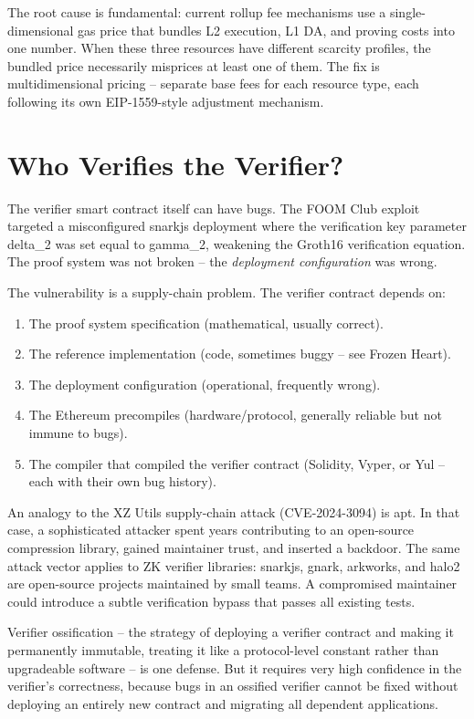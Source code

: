 \documentclass[
  11pt,
  openany]{report}
\providecommand{\tightlist}{%
  \setlength{\itemsep}{0pt}\setlength{\parskip}{0pt}}
\begin{document}
The root cause is fundamental: current rollup fee mechanisms use a
single-dimensional gas price that bundles L2 execution, L1 DA, and proving costs
into one number. When these three resources have different scarcity profiles,
the bundled price necessarily misprices at least one of them. The fix is
multidimensional pricing -- separate base fees for each resource type, each
following its own EIP-1559-style adjustment mechanism.

\section{Who Verifies the Verifier?}\label{who-verifies-the-verifier}

The verifier smart contract itself can have bugs. The FOOM Club exploit targeted
a misconfigured snarkjs deployment where the verification key parameter delta\_2
was set equal to gamma\_2, weakening the Groth16 verification equation. The
proof system was not broken -- the \emph{deployment configuration} was wrong.

The vulnerability is a supply-chain problem. The verifier contract depends on:

\begin{enumerate}
\def\labelenumi{\arabic{enumi}.}
\tightlist
\item
  The proof system specification (mathematical, usually correct).
\item
  The reference implementation (code, sometimes buggy -- see Frozen Heart).
\item
  The deployment configuration (operational, frequently wrong).
\item
  The Ethereum precompiles (hardware/protocol, generally reliable but not immune
  to bugs).
\item
  The compiler that compiled the verifier contract (Solidity, Vyper, or Yul --
  each with their own bug history).
\end{enumerate}

An analogy to the XZ Utils supply-chain attack (CVE-2024-3094) is apt. In that
case, a sophisticated attacker spent years contributing to an open-source
compression library, gained maintainer trust, and inserted a backdoor. The same
attack vector applies to ZK verifier libraries: snarkjs, gnark, arkworks, and
halo2 are open-source projects maintained by small teams. A compromised
maintainer could introduce a subtle verification bypass that passes all existing
tests.

Verifier ossification -- the strategy of deploying a verifier contract and
making it permanently immutable, treating it like a protocol-level constant
rather than upgradeable software -- is one defense. But it requires very high
confidence in the verifier's correctness, because bugs in an ossified verifier
cannot be fixed without deploying an entirely new contract and migrating all
dependent applications.
\end{document}
